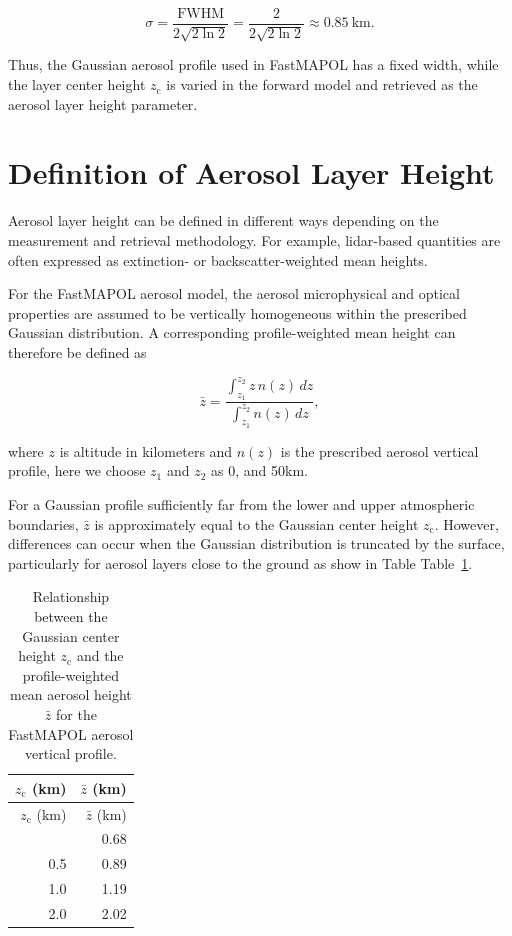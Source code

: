 \documentclass[
  11pt,
  letterpaper,
]{scrreprt}
\begin{document}
\[
\sigma =
\frac{\mathrm{FWHM}}
{2\sqrt{2\ln 2}}
=
\frac{2}
{2\sqrt{2\ln 2}}
\approx 0.85~\mathrm{km}.
\]

Thus, the Gaussian aerosol profile used in FastMAPOL has a fixed width,
while the layer center height \(z_{\mathrm{c}}\) is varied in the
forward model and retrieved as the aerosol layer height parameter.

\section{Definition of Aerosol Layer
Height}\label{definition-of-aerosol-layer-height}

Aerosol layer height can be defined in different ways depending on the
measurement and retrieval methodology. For example, lidar-based
quantities are often expressed as extinction- or backscatter-weighted
mean heights.

For the FastMAPOL aerosol model, the aerosol microphysical and optical
properties are assumed to be vertically homogeneous within the
prescribed Gaussian distribution. A corresponding profile-weighted mean
height can therefore be defined as

\[
\bar{z} =
\frac{\displaystyle\int_{z_1}^{z_2} z\,n(z)\,dz}
{\displaystyle\int_{z_1}^{z_2} n(z)\,dz},
\]

where \(z\) is altitude in kilometers and \(n(z)\) is the prescribed
aerosol vertical profile, here we choose \(z_1\) and \(z_2\) as 0, and
50km.

For a Gaussian profile sufficiently far from the lower and upper
atmospheric boundaries, \(\bar{z}\) is approximately equal to the
Gaussian center height \(z_{\mathrm{c}}\). However, differences can
occur when the Gaussian distribution is truncated by the surface,
particularly for aerosol layers close to the ground as show in Table
Table~\ref{tbl-alh-height}.

\begin{longtable}[]{@{}rr@{}}
\caption{Relationship between the Gaussian center height
\(z_{\mathrm{c}}\) and the profile-weighted mean aerosol height
\(\bar{z}\) for the FastMAPOL aerosol vertical
profile.}\label{tbl-alh-height}\tabularnewline
\toprule\noalign{}
\(z_{\mathrm{c}}\) (km) & \(\bar{z}\) (km) \\
\midrule\noalign{}
\endfirsthead
\toprule\noalign{}
\(z_{\mathrm{c}}\) (km) & \(\bar{z}\) (km) \\
\midrule\noalign{}
\endhead
\bottomrule\noalign{}
\endlastfoot
0.0 & 0.68 \\
0.5 & 0.89 \\
1.0 & 1.19 \\
2.0 & 2.02 \\
\end{longtable}
\end{document}
